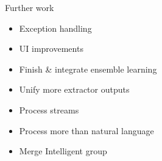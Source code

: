 \begin{frame}{Further work}
	\begin{itemize}
		\item Exception handling
		\item UI improvements
		\item Finish \& integrate ensemble learning
		\item Unify more extractor outputs
		\item Process streams
		\item Process more than natural language
		\item Merge Intelligent group
	\end{itemize}
\end{frame}